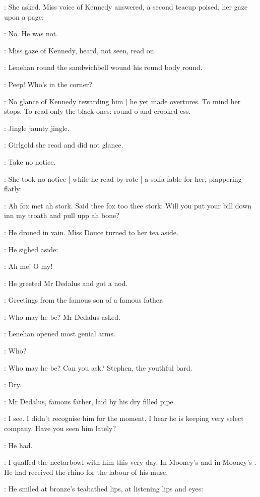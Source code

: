 :
She asked.
Miss voice of Kennedy answered,
a second teacup poised,
her gaze upon a page:

\MissK:
No.
He was not.

:
Miss gaze of Kennedy,
heard,
not seen,
read on.

:
Lenehan round the sandwichbell wound his round body round.

\lenehan:
Peep!
Who's in the corner?

:
No glance of Kennedy rewarding him |
he yet made overtures.
To mind her stops.
To read only the black ones:
round o and crooked ess.

:
Jingle jaunty jingle.

:
Girlgold she read and did not glance.

\MissK:
Take no notice.

:
She took no notice |
while he read by rote |
a solfa fable for her,
plappering flatly:

\lenehan:
Ah fox met ah stork.
Said thee fox too thee stork:
Will you put your bill down inn my troath and pull upp ah bone?

:
He droned in vain.
Miss Douce turned to her tea aside.

:
He sighed aside:

\lenehan:
Ah me!
O my!

:
He greeted Mr Dedalus and got a nod.

\lenehan:
Greetings from the famous son of a famous father.

\simon:
Who may he be?
\sout{Mr Dedalus asked.}

:
Lenehan opened most genial arms.

\lenehan:
Who?

\lenehan:
Who may he be?
Can you ask?
Stephen,
the youthful bard.

:
Dry.

:
Mr Dedalus,
famous father,
laid by his dry filled pipe.

\simon:
I see.
I didn't recognise him for the moment.
I hear he is keeping very select company.
Have you seen him lately?

:
He had.

\lenehan:
I quaffed the nectarbowl with him this very day.
In Mooney's 
and in Mooney's .
He had received the rhino for the labour of his muse.

:
He smiled at bronze's teabathed lips,
at listening lips and eyes:

